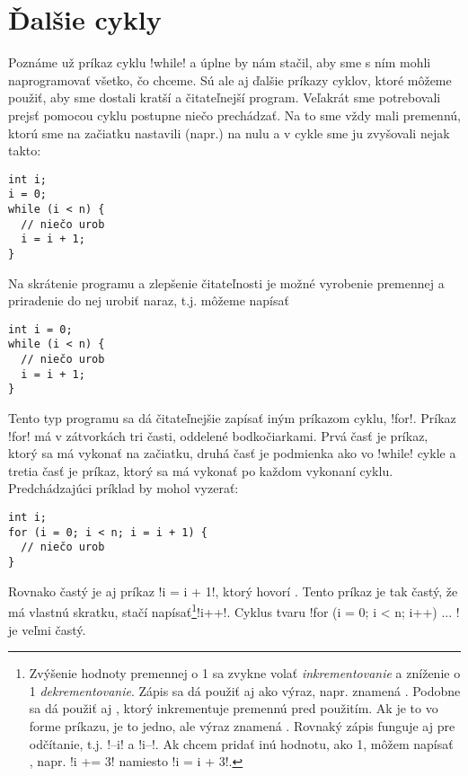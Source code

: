 \chapter{Ďalšie cykly}

Poznáme už príkaz cyklu \prg!while! a úplne by nám stačil, aby sme s ním mohli 
naprogramovať všetko, čo chceme. Sú ale aj ďalšie príkazy cyklov, ktoré môžeme
použiť, aby sme dostali kratší a čitateľnejší program. Veľakrát sme potrebovali
prejsť pomocou cyklu postupne niečo prechádzať. Na to sme vždy mali premennú,
ktorú sme na začiatku nastavili (napr.) na nulu
a v cykle sme ju zvyšovali nejak takto:\\

\begin{lstlisting}
int i;
i = 0;
while (i < n) {
  // niečo urob
  i = i + 1;
}
\end{lstlisting}

Na skrátenie programu a zlepšenie čitateľnosti je možné vyrobenie premennej
a priradenie do nej urobiť naraz, t.j. môžeme napísať\\

\begin{lstlisting} 
int i = 0;
while (i < n) {
  // niečo urob
  i = i + 1;
}
\end{lstlisting}

Tento typ programu sa dá čitateľnejšie zapísať iným príkazom cyklu, \prg!for!.
Príkaz \prg!for! má v zátvorkách tri časti, oddelené bodkočiarkami. Prvá časť
je príkaz, ktorý sa má vykonať na začiatku, druhá časť je podmienka ako vo \prg!while!
cykle a tretia časť je príkaz, ktorý sa má vykonať po každom vykonaní cyklu.
Predchádzajúci príklad by mohol vyzerať:\\

\begin{lstlisting}
int i;
for (i = 0; i < n; i = i + 1) {
  // niečo urob
}
\end{lstlisting}


Rovnako častý je aj príkaz \prg!i = i + 1!, ktorý hovorí . Tento príkaz je tak
častý, že má vlastnú skratku, stačí napísať\footnote{\label{foot.inc-vyraz}
  Zvýšenie hodnoty premennej o 1 sa zvykne volať {\em inkrementovanie} a zníženie
  o 1 {\em dekrementovanie}.
  Zápis  sa dá použiť
  aj ako výraz, napr.  znamená .
  Podobne sa dá použiť aj , ktorý inkrementuje premennú pred použitím. 
  Ak je to vo forme príkazu, je to jedno, ale výraz \hbox{} znamená
  .
  Rovnaký zápis funguje aj pre odčítanie, t.j. \prg!--i! a \prg!i--!.
  Ak chcem pridať inú hodnotu, ako 1, môžem napísať \vb{+=}, napr. \prg!i += 3! namiesto
  \prg!i = i + 3!.
}\prg!i++!. Cyklus tvaru
\prg!for (i = 0; i < n; i++) { ... }! 
je veľmi častý. 


